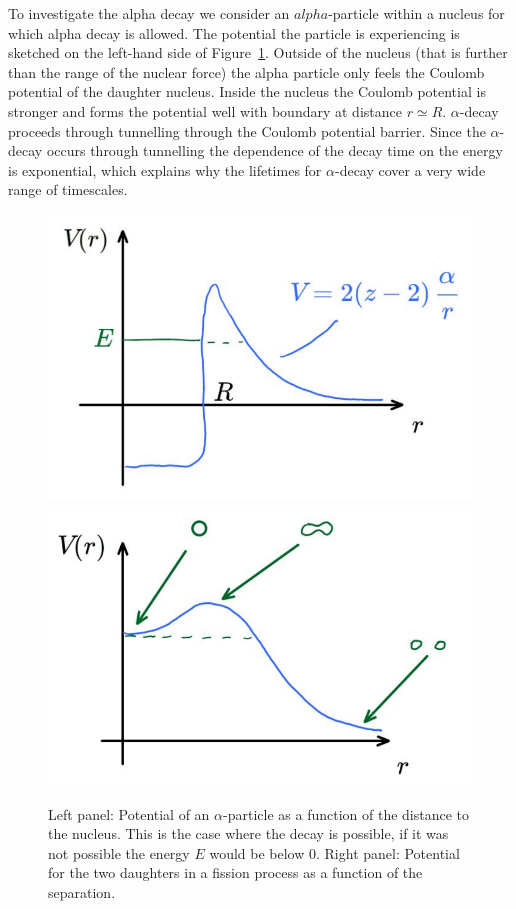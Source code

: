 \documentclass[12pt]{article}
\begin{document}
To investigate the alpha decay we consider an $alpha$-particle within a nucleus for which alpha decay is allowed. The potential the particle is experiencing is sketched on the left-hand side of Figure~\ref{fig:fissionPotentials}. Outside of the nucleus (that is further than the range of the nuclear force) the alpha particle only feels the Coulomb potential of the daughter nucleus. Inside the nucleus the Coulomb potential is stronger and forms the potential well with boundary at distance $r\simeq R$. $\alpha$-decay proceeds through tunnelling through the Coulomb potential barrier. Since the $\alpha$-decay occurs through tunnelling the dependence of the decay time on the energy is exponential, which explains why the lifetimes for $\alpha$-decay cover a very wide range of timescales.    
\begin{figure}
\begin{center}
\includegraphics[scale=0.3]{images/alphaDecayPotential.png}
\includegraphics[scale=0.25]{images/fissionPotential.png}
\end{center}
\caption{Left panel: Potential of an $\alpha$-particle as a function of the distance to the nucleus. This is the case where the decay is possible, if it was not possible the energy $E$ would be below $0$. Right panel: Potential for the two daughters in a fission process as a function of the separation.}\label{fig:fissionPotentials}
\end{figure}
%
%
\end{document}
